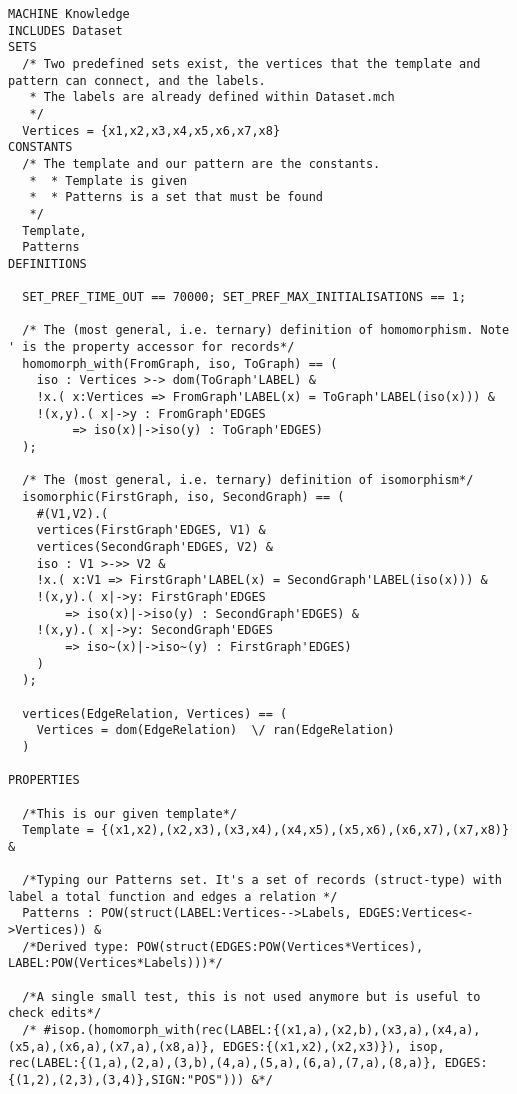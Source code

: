 \begin{lstlisting}[caption=ProB specification (without dataset), style=model]
MACHINE Knowledge
INCLUDES Dataset
SETS
  /* Two predefined sets exist, the vertices that the template and pattern can connect, and the labels.
   * The labels are already defined within Dataset.mch
   */
  Vertices = {x1,x2,x3,x4,x5,x6,x7,x8}
CONSTANTS
  /* The template and our pattern are the constants.
   *  * Template is given
   *  * Patterns is a set that must be found
   */
  Template,
  Patterns
DEFINITIONS

  SET_PREF_TIME_OUT == 70000; SET_PREF_MAX_INITIALISATIONS == 1;

  /* The (most general, i.e. ternary) definition of homomorphism. Note ' is the property accessor for records*/
  homomorph_with(FromGraph, iso, ToGraph) == (
    iso : Vertices >-> dom(ToGraph'LABEL) &
    !x.( x:Vertices => FromGraph'LABEL(x) = ToGraph'LABEL(iso(x))) &
    !(x,y).( x|->y : FromGraph'EDGES
         => iso(x)|->iso(y) : ToGraph'EDGES)
  );

  /* The (most general, i.e. ternary) definition of isomorphism*/
  isomorphic(FirstGraph, iso, SecondGraph) == (  
    #(V1,V2).(
    vertices(FirstGraph'EDGES, V1) &
    vertices(SecondGraph'EDGES, V2) &
    iso : V1 >->> V2 &
    !x.( x:V1 => FirstGraph'LABEL(x) = SecondGraph'LABEL(iso(x))) &
    !(x,y).( x|->y: FirstGraph'EDGES
        => iso(x)|->iso(y) : SecondGraph'EDGES) &
    !(x,y).( x|->y: SecondGraph'EDGES
        => iso~(x)|->iso~(y) : FirstGraph'EDGES)
    )
  );
  
  vertices(EdgeRelation, Vertices) == (
    Vertices = dom(EdgeRelation)  \/ ran(EdgeRelation)
  )

PROPERTIES

  /*This is our given template*/
  Template = {(x1,x2),(x2,x3),(x3,x4),(x4,x5),(x5,x6),(x6,x7),(x7,x8)} &

  /*Typing our Patterns set. It's a set of records (struct-type) with label a total function and edges a relation */
  Patterns : POW(struct(LABEL:Vertices-->Labels, EDGES:Vertices<->Vertices)) &
  /*Derived type: POW(struct(EDGES:POW(Vertices*Vertices), LABEL:POW(Vertices*Labels)))*/

  /*A single small test, this is not used anymore but is useful to check edits*/
  /* #isop.(homomorph_with(rec(LABEL:{(x1,a),(x2,b),(x3,a),(x4,a),(x5,a),(x6,a),(x7,a),(x8,a)}, EDGES:{(x1,x2),(x2,x3)}), isop, rec(LABEL:{(1,a),(2,a),(3,b),(4,a),(5,a),(6,a),(7,a),(8,a)}, EDGES:{(1,2),(2,3),(3,4)},SIGN:"POS"))) &*/


\end{lstlisting}
